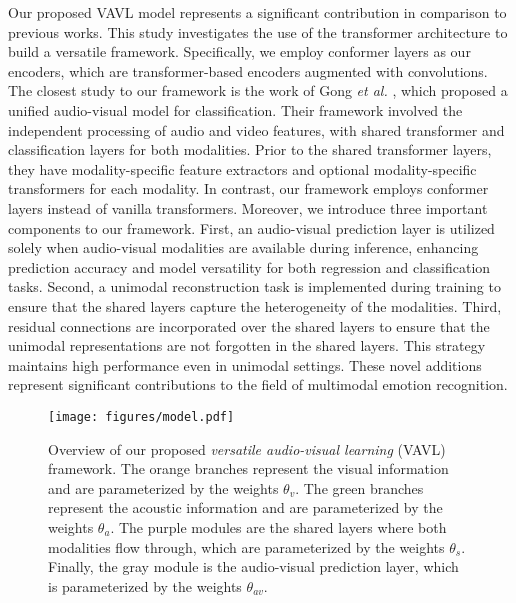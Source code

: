 \documentclass{article}
\def \etal {\textit{et al. }}
\begin{document}
Our proposed VAVL model represents a significant contribution in comparison to previous works. This study investigates the use of the transformer architecture to build a versatile framework. Specifically, we employ conformer layers \cite{gulati_2020} as our encoders, which are transformer-based encoders augmented with convolutions. The closest study to our framework is the work of Gong \etal \cite{gong_2022}, which proposed a unified audio-visual model for classification. Their framework involved the independent processing of audio and video features, with shared transformer and classification layers for both modalities. Prior to the shared transformer layers, they have modality-specific feature extractors and optional modality-specific transformers for each modality. In contrast, our framework employs conformer layers instead of vanilla transformers. Moreover, we introduce three important components to our framework. First, an audio-visual prediction layer is utilized solely when audio-visual modalities are available during inference, enhancing prediction accuracy and model versatility for both regression and classification tasks. Second, a unimodal reconstruction task is implemented during training to ensure that the shared layers capture the heterogeneity of the modalities. Third, residual connections are incorporated over the shared layers to ensure that the unimodal representations are not forgotten in the shared layers. This strategy maintains high performance even in unimodal settings. These novel additions represent significant contributions to the field of multimodal emotion recognition. 
























\begin{figure}[t]
    \centering
    \texttt{[image: figures/model.pdf]}
    \caption{Overview of our proposed \emph{versatile audio-visual learning} (VAVL) framework. The orange branches represent the visual information and are parameterized by the weights $\theta_v$. The green branches represent the acoustic information and are parameterized by the weights $\theta_a$. The purple modules are the shared layers where both modalities flow through, which are parameterized by the weights $\theta_s$. Finally, the gray module is the audio-visual prediction layer, which is parameterized by the weights $\theta_{av}$.}
    \label{fig:model}
\end{figure}
\end{document}
